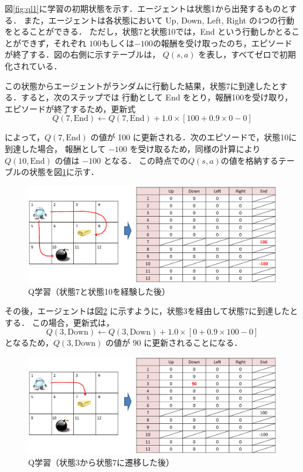 図\ref{fig:ql1}に学習の初期状態を示す．エージェントは状態1から出発するものとする．
また，エージェントは各状態において Up, Down, Left, Right の4つの行動をとることができる．
ただし，状態7と状態10では，End という行動しかとることができず，それぞれ
$100$もしくは$-100$の報酬を受け取ったのち，エピソードが終了する．図の右側に示すテーブルは，
$Q(s,a)$ を表し，すべてゼロで初期化されている．

この状態からエージェントがランダムに行動した結果，状態7に到達したとする．すると，次のステップでは
行動として End をとり，報酬100を受け取り，エピソードが終了するため，更新式
\begin{equation}
Q(7, \mbox{End}) \leftarrow Q(7, \mbox{End}) + 1.0 \times [ 100 + 0.9 \times 0 - 0 ]
\end{equation}

\noindent
によって，$Q(7, \mbox{End})$ の値が 100 に更新される．次のエピソードで，状態10に到達した場合，
報酬として $-100$ を受け取るため，同様の計算により $Q(10, \mbox{End})$ の値は $-100$ となる．
この時点での$Q(s,a)$の値を格納するテーブルの状態を図\ref{fig:ql2}に示す．


\begin{figure}[t]
 \begin{center}
  \includegraphics[width=140mm]{images/TsuruokaLab/ql2.eps}
 \end{center}
 \caption{Q学習（状態7と状態10を経験した後）}
 \label{fig:ql2}
\end{figure}

その後，エージェントは図\ref{fig:ql3} に示すように，状態3を経由して状態7に到達したとする．
この場合，更新式は，
\begin{equation}
Q(3, \mbox{Down}) \leftarrow Q(3, \mbox{Down}) + 1.0 \times [ 0 + 0.9 \times 100 - 0 ]
\end{equation}
\noindent
となるため，$Q(3, \mbox{Down}) $ の値が 90 に更新されることになる．


\begin{figure}[t]
 \begin{center}
  \includegraphics[width=140mm]{images/TsuruokaLab/ql3.eps}
 \end{center}
 \caption{Q学習（状態3から状態7に遷移した後）}
 \label{fig:ql3}
\end{figure}


